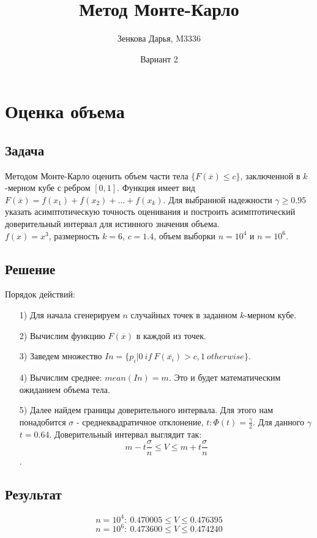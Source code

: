 \documentclass[fleqn, 10pt]{article}
\title{Метод Монте-Карло}
\author{Зенкова Дарья, M3336}
\date{Вариант 2}
\begin{document}
\maketitle
{}

\section{Оценка объема}
\subsection{Задача}
Методом Монте-Карло оценить объем части тела \(\{F(\overline{x}) \leq c\}\), заключенной в \(k\)-мерном кубе с ребром \([0, 1]\). Функция имеет вид \(F(\overline{x}) = f(x_1) + f(x_2) + ... + f(x_k)\). Для выбранной надежности \(\gamma \geq 0.95\) указать асимптотическую точность оценивания и построить асимптотический доверительный интервал для истинного значения объема.\\
\(f(x) = x^3\), размерность \(k = 6\), \(c = 1.4\), объем выборки \(n = 10^4\) и \(n = 10^6\).
\subsection{Решение}
Порядок действий:
\begin{itemize}
\item[1)] Для начала сгенерируем \(n\) случайных точек в заданном \(k\)-мерном кубе.
\item[2)] Вычислим функцию \(F(\overline{x})\) в каждой из точек.
\item[3)] Заведем множество \(In = \{p_i | 0 \ if \ F(\overline{x_i}) > c,1\ otherwise\}\).
\item[4)] Вычислим среднее: \(mean(In) = m\). Это и будет математическим ожиданием объема тела.
\item[5)] Далее найдем границы доверительного интервала. Для этого нам понадобится \(\sigma\) - среднеквадратичное отклонение, \(t : \Phi(t) = \frac{\gamma}{2}\). Для данного \(\gamma\) \(t = 0.64\). Доверительный интервал выглядит так: \[m - t\frac{\sigma}{n} \leq V \leq m + t\frac{\sigma}{n}\].
  
\end{itemize}
\subsection{Результат}
\[n = 10^4: \ 0.470005 \leq V \leq 0.476395\]
\[n = 10^6: \ 0.473600 \leq V \leq 0.474240\]
\end{document}
